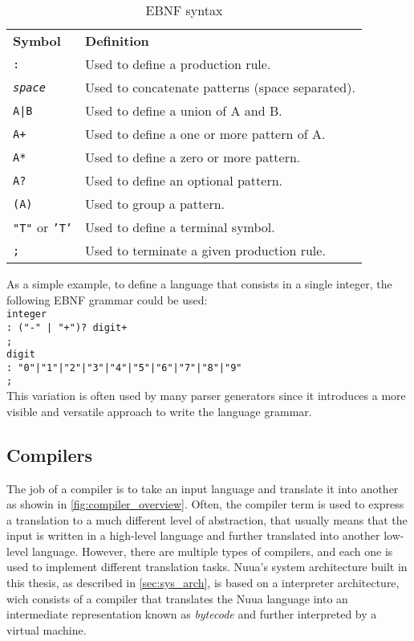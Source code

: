 \begin{table}[H]
    \centering
    \begin{tabular}{ l p{10cm} }
        \textbf{Symbol} & \textbf{Definition} \\
        \texttt{:} & Used to define a production rule. \\
        \texttt{\textit{space}} & Used to concatenate patterns (space separated). \\
        \texttt{A|B} & Used to define a union of A and B. \\
        \texttt{A+} & Used to define a one or more pattern of A. \\
        \texttt{A*} & Used to define a zero or more pattern. \\
        \texttt{A?} & Used to define an optional pattern. \\
        \texttt{(A)} & Used to group a pattern. \\
        \texttt{"T"} or \texttt{'T'} & Used to define a terminal symbol. \\
        \texttt{;} & Used to terminate a given production rule. \\
    \end{tabular}
    \caption{EBNF syntax}
    \label{fig:ebnf_syntax}
\end{table}

As a simple example, to define a language that consists in a single integer, the following EBNF grammar could be used:\\

\texttt{integer\\\tab: ("-" | "+")? digit+\\\tab;}\\
\texttt{digit\\\tab: "0"|"1"|"2"|"3"|"4"|"5"|"6"|"7"|"8"|"9"\\\tab;}\\

This variation is often used by many parser generators since it introduces a more visible and versatile approach to
write the language grammar.

\subsection{Compilers}

The job of a compiler is to take an input language and translate it into another as showin in \autoref{fig:compiler_overview}.
Often, the compiler term is used to express a translation to a much different level of abstraction, that usually means
that the input is written in a high-level language and further translated into another low-level language.
However, there are multiple types of compilers, and each one is used to implement different translation tasks.
Nuua's system architecture built in this thesis, as described in \autoref{sec:sys_arch}, is based on a interpreter architecture, wich consists of a
compiler that translates the Nuua language into an intermediate representation known as \emph{bytecode} and further interpreted by a virtual machine.


